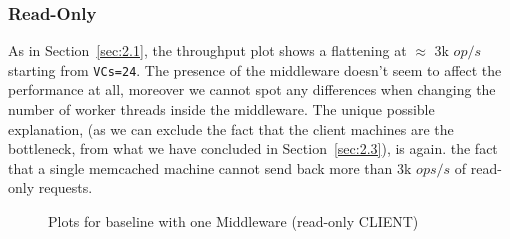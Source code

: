 \documentclass[11pt,a4paper]{article}
\begin{document}
\subsubsection*{Read-Only}

As in Section~\ref{sec:2.1}, the throughput plot shows a flattening at $\approx$ 3k $op/s$ starting from \texttt{VCs=24}.  The presence of the middleware doesn't seem to affect the performance at all, moreover we cannot spot any differences when changing the number of worker threads inside the middleware. The unique possible explanation, (as we can exclude the fact that the client machines are the bottleneck, from what we have concluded in Section~\ref{sec:2.3}), is again. the fact that a single memcached machine cannot send back more than 3k $ops/s$ of read-only requests.

\begin{figure}[!h]
  \centering
  \caption{Plots for baseline with one Middleware (read-only CLIENT)}
  \label{fig:baseline_mw_1_mw_mt_ro}
\end{figure}
\end{document}
